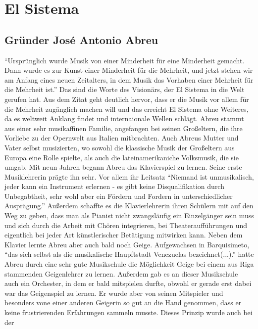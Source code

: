 \section{El Sistema}

\subsection{Gründer José Antonio Abreu}
\enquote{Ursprünglich wurde Musik von einer Minderheit für eine Minderheit
gemacht. Dann wurde es zur Kunst einer Minderheit für die Mehrheit, und jetzt
stehen wir am Anfang eines neuen Zeitalters, in dem Musik das Vorhaben einer
Mehrheit für die Mehrheit ist.} \autocite[5]{kaufmann:el_sistema} Das sind die
Worte des Visionärs, der El Sistema in die Welt gerufen hat. Aus dem Zitat geht
deutlich hervor, dass er die Musik vor allem für die Mehrheit zugänglich machen
will und das erreicht El Sistema ohne Weiteres, da es weltweit Anklang findet
und internaionale Wellen schlägt. Abreu stammt aus einer sehr musikaffinen
Familie, angefangen bei seinen Großeltern, die ihre Vorliebe zu der Opernwelt
aus Italien mitbrachten. Auch Abreus Mutter und Vater selbst musizierten, wo
sowohl die klassische Musik der Großeltern aus Europa eine Rolle spielte, als
auch die lateinamerikaniche Volksmusik, die sie umgab. Mit neun Jahren begann
Abreu das Klavierspiel zu lernen. Seine erste Musiklehrerin prägte ihn sehr. Vor
allem ihr Leitsatz \enquote{Niemand ist unmusikalisch, jeder kann ein Instrument
erlernen - es gibt keine Disqualifikation durch Unbegabtheit, sehr wohl aber ein
Fördern und Fordern in unterschiedlicher Ausprägung.}
\autocite[20]{kaufmann:el_sistema} Außerdem schaffte es die Klavierlehrerin
ihren Schülern mit auf den Weg zu geben, dass man als Pianist nicht zwangsläufig
ein Einzelgänger sein muss und sich durch die Arbeit mit Chören integrieren, bei
Theateraufführungen und eigentlich bei jeder Art künstlerischer Betätigung
mitwirken kann. Neben dem Klavier lernte Abreu aber auch bald noch Geige.
Aufgewachsen in Barquisimeto, \enquote{das sich selbst als die musikalische Haupftstadt
Venezuelas bezeichnet(...).} \autocite[22]{kaufmann:el_sistema} hatte Abreu
durch eine sehr gute Musikschule die Möglichkeit Geige bei einem aus Riga
stammenden Geigenlehrer zu lernen. Außerdem gab es an dieser Musikschule auch
ein Orchester, in dem er bald mitspielen durfte, obwohl er
gerade erst dabei war das Geigenspiel zu lernen. Er wurde aber von seinen Mitspieler und
besonders vone einer anderen Geigerin so gut an die Hand genommen, dass er keine
frustrierenden Erfahrungen sammeln musste. Dieses Prinzip wurde auch bei der
